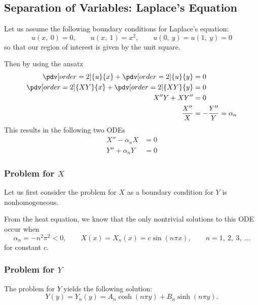\documentclass{article}
\begin{document}
\subsection{Separation of Variables: Laplace's Equation}
Let us assume the following boundary conditions for Laplace's equation:
\begin{equation*}
    u\left( x,\: 0 \right) = 0, \quad \quad u\left( x,\: 1 \right) = x^2, \quad \quad u\left( 0,\: y \right) = u\left( 1,\: y \right) = 0
\end{equation*}
so that our region of interest is given by the unit square.

Then by using the ansatz
\begin{align*}
    \pdv[order=2]{u}{x} + \pdv[order=2]{u}{y}   & = 0                          \\
    \pdv[order=2]{XY}{x} + \pdv[order=2]{XY}{y} & = 0                          \\
    X''Y + XY''                                 & = 0                          \\
    \frac{X''}{X}                               & = - \frac{Y''}{Y} = \alpha_n
\end{align*}
This results in the following two ODEs
\begin{align*}
    X'' - \alpha_n X & = 0 \\
    Y'' + \alpha_n Y & = 0
\end{align*}
\subsubsection{Problem for \(X\)}
Let us first consider the problem for \(X\) as a boundary condition for \(Y\) is nonhomogeneous.

From the heat equation, we know that the only nontrivial solutions to this ODE
occur when
\begin{equation*}
    \alpha_n = - n^2 \pi^2 < 0, \quad \quad X\left( x \right) = X_n\left( x \right) = c \sin{\left( n \pi x \right)}, \quad \quad n = 1,\: 2,\: 3,\: \dots
\end{equation*}
for constant \(c\).
\subsubsection{Problem for \(Y\)}
The problem for \(Y\) yields the following solution:
\begin{equation*}
    Y\left( y \right) = Y_n\left( y \right) = A_n \cosh{\left( n \pi y \right)} + B_n \sinh{\left( n \pi y \right)}.
\end{equation*}
\end{document}

